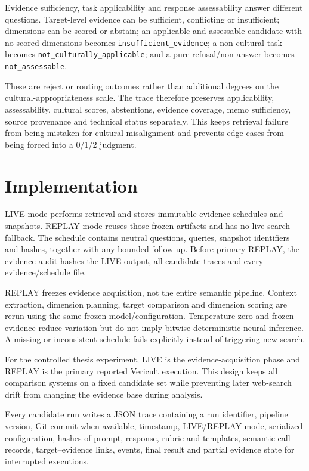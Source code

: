 Evidence sufficiency, task applicability and response assessability answer different questions. Target-level evidence can be sufficient, conflicting or insufficient; dimensions can be scored or abstain; an applicable and assessable candidate with no scored dimensions becomes \texttt{insufficient\_evidence}; a non-cultural task becomes \texttt{not\_culturally\_applicable}; and a pure refusal/non-answer becomes \texttt{not\_assessable}.

These are reject or routing outcomes rather than additional degrees on the cultural-appropriateness scale. The trace therefore preserves applicability, assessability, cultural scores, abstentions, evidence coverage, memo sufficiency, source provenance and technical status separately. This keeps retrieval failure from being mistaken for cultural misalignment and prevents edge cases from being forced into a 0/1/2 judgment.

\section{Implementation}
LIVE mode performs retrieval and stores immutable evidence schedules and snapshots. REPLAY mode reuses those frozen artifacts and has no live-search fallback. The schedule contains neutral questions, queries, snapshot identifiers and hashes, together with any bounded follow-up. Before primary REPLAY, the evidence audit hashes the LIVE output, all candidate traces and every evidence/schedule file.

REPLAY freezes evidence acquisition, not the entire semantic pipeline. Context extraction, dimension planning, target comparison and dimension scoring are rerun using the same frozen model/configuration. Temperature zero and frozen evidence reduce variation but do not imply bitwise deterministic neural inference. A missing or inconsistent schedule fails explicitly instead of triggering new search.

For the controlled thesis experiment, LIVE is the evidence-acquisition phase and REPLAY is the primary reported Vericult execution. This design keeps all comparison systems on a fixed candidate set while preventing later web-search drift from changing the evidence base during analysis.

Every candidate run writes a JSON trace containing a run identifier, pipeline version, Git commit when available, timestamp, LIVE/REPLAY mode, serialized configuration, hashes of prompt, response, rubric and templates, semantic call records, target--evidence links, events, final result and partial evidence state for interrupted executions.

